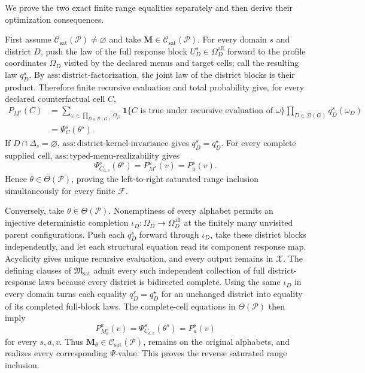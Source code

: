 We prove the two exact finite range equalities separately and then derive their optimization consequences.

First assume \(\mathcal C_{\mathrm{sat}}(\mathcal P)\ne\varnothing\) and take \(\mathbf M\in\mathcal C_{\mathrm{sat}}(\mathcal P)\).  For every domain \(s\) and district \(D\), push the law of the full response block \(U_D^s\in\Omega_D^{\mathrm{all}}\) forward to the profile coordinates \(\Omega_D\) visited by the declared menus and target cells; call the resulting law \(q_D^s\).  By \(\mathrm{ass:district\text{-}factorization}\), the joint law of the district blocks is their product.  Therefore finite recursive evaluation and total probability give, for every declared counterfactual cell \(C\),
\[
\begin{aligned}
P_{M^s}(C)
&=\sum_{\omega\in\prod_{D\in\mathcal D(G)}\Omega_D}
\mathbf 1\{C\text{ is true under recursive evaluation of }\omega\}
\prod_{D\in\mathcal D(G)}q_D^s(\omega_D)\\
&=\Psi_C^s(\theta^s).
\end{aligned}
\]
If \(D\cap\Delta_s=\varnothing\), \(\mathrm{ass:district\text{-}kernel\text{-}invariance}\) gives \(q_D^s=q_D^\star\).  For every complete supplied cell, \(\mathrm{ass:typed\text{-}menu\text{-}realizability}\) gives
\[
\Psi_{C_{a,v}}^s(\theta^s)=P_{M^s}^{a}(v)=P_a^s(v).
\]
Hence \(\theta\in\Theta(\mathcal P)\), proving the left-to-right saturated range inclusion simultaneously for every finite \(\mathcal F\).

Conversely, take \(\theta\in\Theta(\mathcal P)\).  Nonemptiness of every alphabet permits an injective deterministic completion \(\iota_D:\Omega_D\to\Omega_D^{\mathrm{all}}\) at the finitely many unvisited parent configurations.  Push each \(q_D^s\) forward through \(\iota_D\), take these district blocks independently, and let each structural equation read its component response map.  Acyclicity gives unique recursive evaluation, and every output remains in \(\mathcal X\).  The defining clauses of \(\mathfrak M_{\mathrm{sat}}\) admit every such independent collection of full district-response laws because every district is bidirected complete.  Using the same \(\iota_D\) in every domain turns each equality \(q_D^s=q_D^\star\) for an unchanged district into equality of its completed full-block laws.  The complete-cell equations in \(\Theta(\mathcal P)\) then imply
\[
P_{M_\theta^s}^{a}(v)
=\Psi_{C_{a,v}}^s(\theta^s)
=P_a^s(v)
\]
for every \(s,a,v\).  Thus \(\mathbf M_\theta\in\mathcal C_{\mathrm{sat}}(\mathcal P)\), remains on the original alphabets, and realizes every corresponding \(\Psi\)-value.  This proves the reverse saturated range inclusion.


